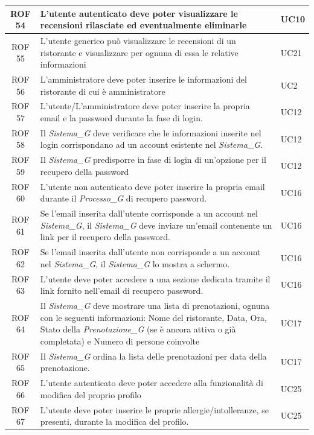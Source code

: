 \documentclass[12pt, oneside]{article}
\begin{document}
\begin{longtable}{|c|p{14cm}|p{2cm}|}
    \hline
    ROF 54 & L'utente autenticato deve poter visualizzare le recensioni rilasciate ed eventualmente eliminarle & UC10 \\
    \hline
    ROF 55 & L'utente generico può visualizzare le recensioni di un ristorante e visualizzare per ognuna di essa le relative informazioni & UC21 \\
    \hline
    ROF 56 & L'amministratore deve poter inserire le informazioni del ristorante di cui è amministratore & UC2 \\
    \hline
    ROF 57 & L'utente/L'amministratore deve poter inserire la propria email e la password durante la fase di login.  & UC12 \\
    \hline
    ROF 58 & Il \textit{Sistema_G} deve verificare che le informazioni inserite nel login corrispondano ad un account esistente nel \textit{Sistema_G}.  & UC12 \\
    \hline
    ROF 59 & Il \textit{Sistema_G} predisporre in fase di login di un'opzione per il recupero della password  & UC12 \\
    \hline
    ROF 60 & L'utente non autenticato deve poter inserire la propria email durante il \textit{Processo_G} di recupero password.  & UC16 \\
    \hline
    ROF 61 & Se l'email inserita dall'utente corrisponde a un account nel \textit{Sistema_G}, il \textit{Sistema_G} deve inviare un'email contenente un link per il recupero della password.  & UC16 \\
    \hline
    ROF 62 & Se l'email inserita dall'utente non corrisponde a un account nel \textit{Sistema_G}, il \textit{Sistema_G} lo mostra a schermo.  & UC16 \\
    \hline
    ROF 63 & L'utente deve poter accedere a una sezione dedicata tramite il link fornito nell'email di recupero password.  & UC16 \\
    \hline
    ROF 64 & Il \textit{Sistema_G} deve mostrare una lista di prenotazioni, ognuna con le seguenti informazioni:
    Nome del ristorante, Data, Ora, Stato della \textit{Prenotazione_G} (se è ancora attiva o già completata) e Numero di persone coinvolte & UC17 \\
    \hline
    ROF 65 & Il \textit{Sistema_G} ordina la lista delle prenotazioni per data della prenotazione.  & UC17 \\
    \hline
    ROF 66 & L'utente autenticato deve poter accedere alla funzionalità di modifica del proprio profilo  & UC25 \\
    \hline
    ROF 67 & L'utente deve poter inserire le proprie allergie/intolleranze, se presenti, durante la modifica del profilo.  & UC25  \\

\end{longtable}
\end{document}
